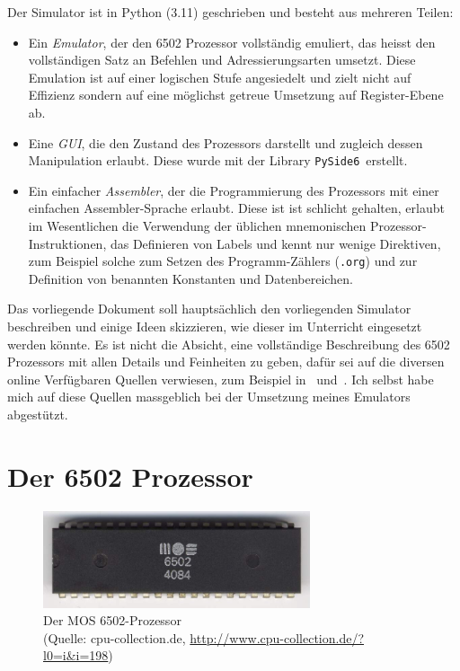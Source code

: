 \documentclass[11pt]{scrartcl}
\newcommand{\pyside}{\lstinline!PySide6!}
\begin{document}
Der Simulator ist in Python (3.11) geschrieben und besteht aus
mehreren Teilen:
\begin{itemize}
\item Ein \emph{Emulator}, der den 6502 Prozessor vollständig
  emuliert, das heisst den vollständigen Satz an Befehlen und
  Adressierungsarten umsetzt. Diese Emulation ist auf einer logischen
  Stufe angesiedelt und zielt nicht auf Effizienz sondern auf eine
  möglichst getreue Umsetzung auf Register-Ebene ab.
\item Eine \emph{GUI}, die den Zustand des Prozessors darstellt und
  zugleich dessen Manipulation erlaubt.  Diese wurde mit der Library
  \pyside\ erstellt.
\item Ein einfacher \emph{Assembler}, der die Programmierung des
  Prozessors mit einer einfachen Assembler-Sprache erlaubt. Diese ist
  ist schlicht gehalten, erlaubt im Wesentlichen die Verwendung der
  üblichen mnemonischen Prozessor-Instruktionen, das Definieren von
  Labels und kennt nur wenige Direktiven, zum Beispiel solche zum
  Setzen des Programm-Zählers (\lstinline!.org!) und zur Definition
  von benannten Konstanten und Datenbereichen.
\end{itemize}

Das vorliegende Dokument soll hauptsächlich den vorliegenden Simulator
beschreiben und einige Ideen skizzieren, wie dieser im Unterricht
eingesetzt werden könnte. Es ist nicht die Absicht, eine vollständige
Beschreibung des 6502 Prozessors mit allen Details und Feinheiten zu
geben, dafür sei auf die diversen online Verfügbaren Quellen
verwiesen, zum Beispiel in~\cite{6502org_reference}
und~\cite{masswerk_6502instructions}. Ich selbst habe mich auf diese Quellen
massgeblich bei der Umsetzung meines Emulators abgestützt.

\newpage
\section{Der 6502 Prozessor}
\begin{figure}
  \centering \includegraphics[width=0.7\textwidth]{6502processor.jpeg}
  \caption{Der MOS 6502-Prozessor \\ (Quelle: cpu-collection.de,
    {\small \protect\url{http://www.cpu-collection.de/?l0=i&i=198})}}
\end{figure}
\end{document}
